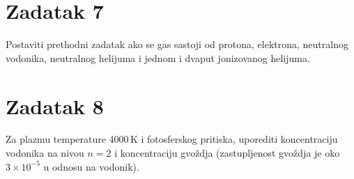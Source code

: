 \documentclass[12pt]{article}
\begin{document}
\section{Zadatak 7}
Postaviti prethodni zadatak ako se gas sastoji od protona, elektrona, neutralnog vodonika, neutralnog helijuma i jednom i dvaput jonizovanog helijuma. 

\section{Zadatak 8}
Za plazmu temperature 4000\,K i fotosferskog pritiska, uporediti koncentraciju vodonika na nivou $n=2$ i koncentraciju gvo\v{z}dja (zastupljenost gvo\v{z}dja je oko $3\times 10^{-5}$ u odnosu na vodonik).
\end{document}
